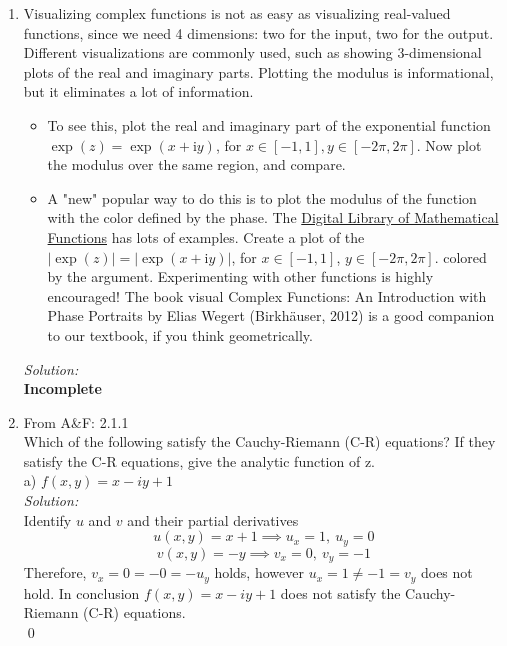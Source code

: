 \documentclass[10pt]{amsart}
\newcommand{\I}{\mathrm{i}}
\theoremstyle{nonumberplain}
\begin{document}
\begin{enumerate}[label={\bf {\arabic*}:}]
\item Visualizing complex functions is not as easy as visualizing
  real-valued functions, since we need 4 dimensions: two for the input,
  two for the output. Different visualizations are commonly used, such
  as showing 3-dimensional plots of the real and imaginary
  parts. Plotting the modulus is informational, but it eliminates a
  lot of information.
  \begin{itemize}
\item To see this, plot the real and imaginary part of the exponential function $\exp (z)=\exp (x+\I y)$, for $x \in[-1,1], y \in[-2 \pi, 2 \pi]$. Now plot the modulus over the same region, and compare.
\item A "new" popular way to do this is to plot the modulus of the
function with the color defined by the phase. The \href{https://dlmf.nist.gov/}{Digital Library of
Mathematical Functions} has lots of examples. Create a plot of the
$|\exp (z)|=|\exp (x+\I y)|$, for $x \in[-1,1]$, $y \in[-2 \pi, 2
\pi]$. colored by the argument. Experimenting with other functions is
highly encouraged! The book visual Complex Functions: An Introduction
with Phase Portraits by Elias Wegert (Birkhäuser, 2012) is a good
companion to our textbook, if you think geometrically.
\end{itemize}
\textit{Solution:} \\
\textbf{Incomplete} \\
\item From A\&F: 2.1.1 \\
Which of the following satisfy the Cauchy-Riemann (C-R) equations? If they satisfy the C-R equations, give the analytic function of z. \\
a) $f(x, y) = x - iy + 1$ \\
\textit{Solution:} \\
Identify $u$ and $v$ and their partial derivatives
$$ u(x,y) = x + 1 \implies u_x = 1, \: u_y = 0$$
$$v(x,y) = - y \implies v_x = 0, \: v_y = -1$$
Therefore, $v_x = 0 = - 0 = - u_y$ holds, however $u_x = 1 \neq - 1 = v_y$ does not hold.
In conclusion $f(x, y) = x - iy + 1$ does not satisfy the Cauchy-Riemann (C-R) equations.\\
\qed


\end{enumerate}
\end{document}
